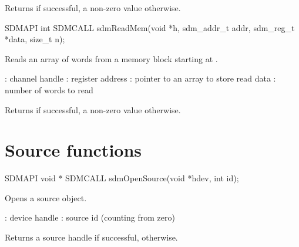 \documentclass[a4paper,12pt,twoside,extrafontsizes]{memoir}
\begin{document}
\begin{funcret}
	Returns  if successful, a non-zero value otherwise.
\end{funcret}



\begin{cfuncprototype}
SDMAPI int SDMCALL sdmReadMem(void *h, sdm_addr_t addr, sdm_reg_t *data, size_t n);
\end{cfuncprototype}

\begin{funcdescr}
	Reads an array of words from a memory block starting at .
\end{funcdescr}

\begin{funcparams}
	: channel handle
	: register address
	: pointer to an array to store read data
	: number of words to read
\end{funcparams}

\begin{funcret}
	Returns  if successful, a non-zero value otherwise.
\end{funcret}

\section{Source functions}
\label{sec:sourcefunctions}



\begin{cfuncprototype}
SDMAPI void * SDMCALL sdmOpenSource(void *hdev, int id);
\end{cfuncprototype}

\begin{funcdescr}
	Opens a source object.
\end{funcdescr}

\begin{funcparams}
	: device handle
	: source id (counting from zero)
\end{funcparams}

\begin{funcret}
	Returns a source handle if successful,  otherwise.
\end{funcret}
\end{document}
